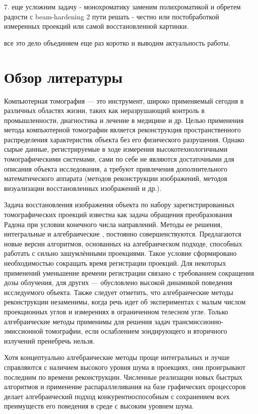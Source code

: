 7. еще усложним задачу - монохроматику заменим полихроматикой и обретем радости с beam-hardening 2 пути решать - честно или постобработкой измеренных проекций или самой восстановленной картинки.

все это дело объединяем еще раз коротко и выводим актуальность работы.

\section{Обзор литературы}


Компьютерная томография --- это инструмент, широко применяемый сегодня в различных областях жизни, таких как неразрушающий контроль в промышленности, диагностика и лечение  в медицине и др. Целью применения метода компьютерной томографии является реконструкция пространственного распределения характеристик объекта без его физического разрушения. Однако сырые данные, регистрируемые в ходе измерения высокотехнологичными томографическими системами, сами по себе не являются достаточными для описания объекта исследования, а требуют привлечения дополнительного математического аппарата (методов реконструкции изображений, методов визуализации восстановленных изображений и др.). 

Задача восстановления изображения объекта по набору зарегистрированных томографических проекций известна как задача обращения преобразования Радона при условии конечного числа направлений. Методы ее решения, интегральные \cite{herman2013mathematical} и алгебраические \cite{algebraic_methods}, постоянно совершенствуются. Предлагаются новые версии алгоритмов, основанных на алгебраическом подходе, способных работать с сильно зашумлёнными проекциями. Такое условие сформировано необходимостью сокращать время регистрации проекций. Для некоторых применений уменьшение времени регистрации связано с требованием сокращения дозы облучения, для других --- обусловлено высокой динамикой поведения исследуемого объекта. Также следует отметить, что алгебраические методы реконструкции незаменимы, когда речь идет об экспериментах с малым числом проекционных углов и измерениях в ограниченном телесном угле. Только алгебраические методы применимы для решения задач трансмиссионно-эмиссионной томографии, если ослаблением зондирующего и вторичного излучений пренебречь нельзя.

Хотя концептуально алгебраические методы проще интегральных и лучше справляются с наличием высокого уровня шума в проекциях, они проигрывают последним по времени реконструкции. Численные реализации новых быстрых алгоритмов и применение распараллеливания на базе графических процессоров делает алгебраический подход конкурентноспособным с сохранением всех преимуществ его поведения в среде с высоким уровнем шума.

